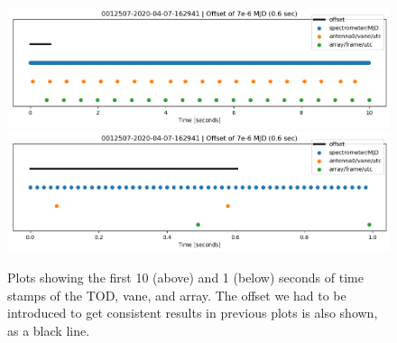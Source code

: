 \documentclass[10pt, a4paper]{article}
\begin{document}
\begin{figure}[h!]
    \centering
    \includegraphics[scale=0.6]{../times_20.png}
    \includegraphics[scale=0.6]{../times_2.png}
    \caption{Plots showing the first 10 (above) and 1 (below) seconds of time stamps of the TOD, vane, and array. The offset we had to be introduced to get consistent results in previous plots is also shown, as a black line.}
    \label{}
\end{figure}
\end{document}
